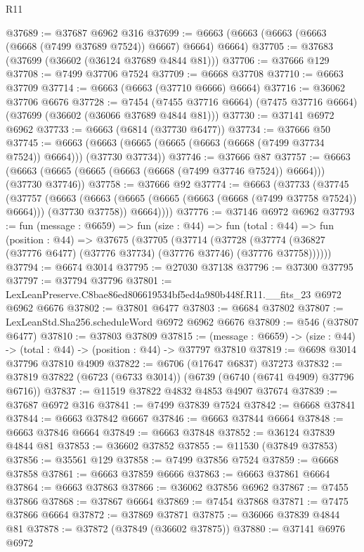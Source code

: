 \begin{lexlean}{R11}
\begin{coremodule}
@37689 := @37687 @6962 @316
@37699 := @6663 (@6663 (@6663 (@6663 (@6668 (@7499 @37689 @7524)) @6667) @6664) @6664)
@37705 := @37683 (@37699 (@36602 (@36124 @37689 @4844 @81)))
@37706 := @37666 @129
@37708 := @7499 @37706 @7524
@37709 := @6668 @37708
@37710 := @6663 @37709
@37714 := @6663 (@6663 (@37710 @6666) @6664)
@37716 := @36062 @37706 @6676
@37728 := @7454
    (@7455 @37716 @6664)
    (@7475 @37716 @6664)
    (@37699 (@36602 (@36066 @37689 @4844 @81)))
@37730 := @37141 @6972 @6962
@37733 := @6663 (@6814 (@37730 @6477))
@37734 := @37666 @50
@37745 := @6663 (@6663 (@6665 (@6665 (@6663 (@6668 (@7499 @37734 @7524)) @6664))) (@37730 @37734))
@37746 := @37666 @87
@37757 := @6663 (@6663 (@6665 (@6665 (@6663 (@6668 (@7499 @37746 @7524)) @6664))) (@37730 @37746))
@37758 := @37666 @92
@37774 := @6663
    (@37733
      (@37745
        (@37757
          (@6663
            (@6663 (@6665 (@6665 (@6663 (@6668 (@7499 @37758 @7524)) @6664))) (@37730 @37758))
            @6664))))
@37776 := @37146 @6972 @6962
@37793 := fun (message : @6659) =>
  fun (size : @44) =>
  fun (total : @44) =>
  fun (position : @44) =>
  @37675
    (@37705
      (@37714
        (@37728 (@37774 (@36827 (@37776 @6477) (@37776 @37734) (@37776 @37746) (@37776 @37758))))))
@37794 := @6674 @3014
@37795 := @27030 @37138
@37796 := @37300 @37795
@37797 := @37794 @37796
@37801 := LexLeanPreserve.C8bae86ed806619534bf5ed4a980b448f.R11.__fits_23 @6972 @6962 @6676
@37802 := @37801 @6477
@37803 := @6684 @37802
@37807 := LexLeanStd.Sha256.scheduleWord @6972 @6962 @6676
@37809 := @546 (@37807 @6477)
@37810 := @37803 @37809
@37815 := (message : @6659) -> (size : @44) -> (total : @44) -> (position : @44) -> @37797 @37810
@37819 := @6698 @3014 @37796 @37810 @4909
@37822 := @6706 (@17647 @6837) @37273
@37832 := @37819 @37822 (@6723 (@6733 @3014)) (@6739 (@6740 (@6741 @4909) @37796 @6716))
@37837 := @11519 @37822 @4832 @4853 @4907 @37674
@37839 := @37687 @6972 @316
@37841 := @7499 @37839 @7524
@37842 := @6668 @37841
@37844 := @6663 @37842 @6667
@37846 := @6663 @37844 @6664
@37848 := @6663 @37846 @6664
@37849 := @6663 @37848
@37852 := @36124 @37839 @4844 @81
@37853 := @36602 @37852
@37855 := @11530 (@37849 @37853)
@37856 := @35561 @129
@37858 := @7499 @37856 @7524
@37859 := @6668 @37858
@37861 := @6663 @37859 @6666
@37863 := @6663 @37861 @6664
@37864 := @6663 @37863
@37866 := @36062 @37856 @6962
@37867 := @7455 @37866
@37868 := @37867 @6664
@37869 := @7454 @37868
@37871 := @7475 @37866 @6664
@37872 := @37869 @37871
@37875 := @36066 @37839 @4844 @81
@37878 := @37872 (@37849 (@36602 @37875))
@37880 := @37141 @6976 @6972

\end{coremodule}
\end{lexlean}
